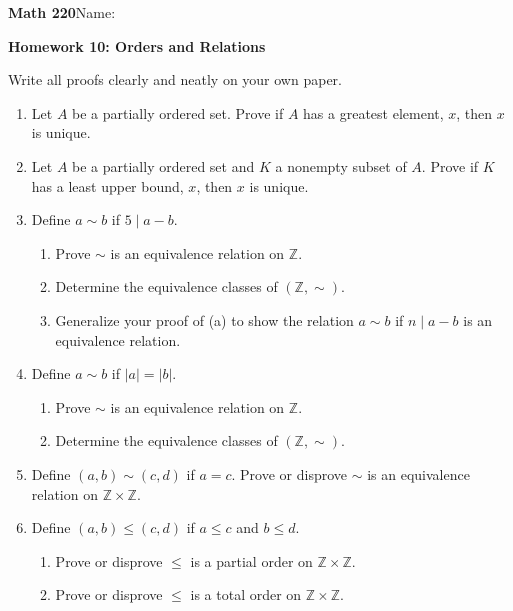 \documentclass{article}
\begin{document}
{\bf Math 220}\hfill{Name:}

{\bf Homework 10: Orders and Relations}
\vspace{.3in}

Write all proofs clearly and neatly on your own paper.

\begin{enumerate}

\item Let $A$ be a partially ordered set. Prove if $A$ has a greatest element, $x$, then $x$ is unique.

\item Let $A$ be a partially ordered set and $K$ a nonempty subset of $A$. Prove if $K$ has a least upper bound, $x$, then $x$ is unique.

\item Define $a\sim b$ if $5\mid a-b$. 
\begin{enumerate}
\item Prove $\sim$ is an equivalence relation on $\mathbb{Z}$.
\item Determine the equivalence classes of $(\mathbb{Z}, \sim)$.
\item Generalize your proof of  (a) to show the relation $a\sim b$ if $n\mid a-b$ is an equivalence relation.
\end{enumerate} 


\item Define $a\sim b$ if $|a|=|b|$. 
\begin{enumerate}
\item Prove $\sim$ is an equivalence relation on $\mathbb{Z}$.
\item Determine the equivalence classes of $(\mathbb{Z}, \sim)$.
\end{enumerate} 

\item Define $(a, b)\sim (c, d)$ if $a= c$.
Prove or disprove $\sim$ is an equivalence relation on $\mathbb{Z}\times\mathbb{Z}$.

\item Define $(a, b)\leq (c, d)$ if $a\leq c$ and $b\leq d$.
\begin{enumerate}
\item Prove or disprove $\leq$ is a partial order on $\mathbb{Z}\times\mathbb{Z}$.
\item Prove or disprove $\leq$ is a total order on $\mathbb{Z}\times\mathbb{Z}$.


\end{enumerate}
\end{enumerate}
\end{document}
